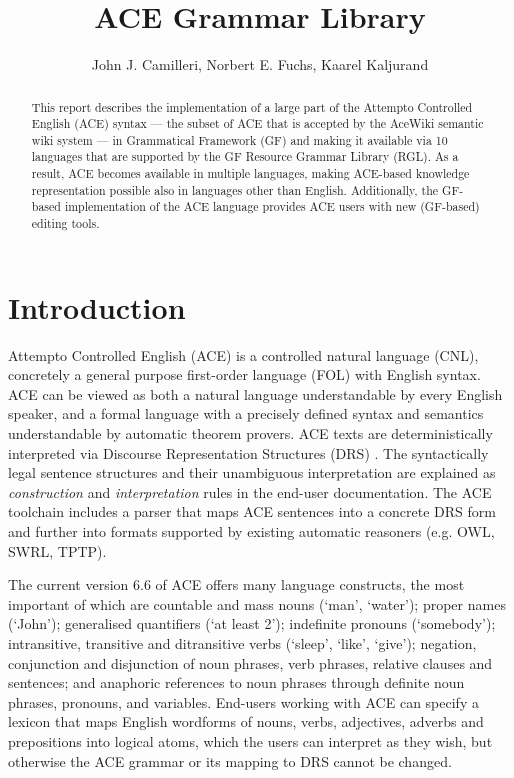 \documentclass[a4paper]{article}
\newcommand\ace{Attempto Controlled English}
\begin{document}
\begin{moltotitlepage}
\title{ACE Grammar Library}
\author{John J. Camilleri, Norbert E. Fuchs, Kaarel Kaljurand}
\end{moltotitlepage}


\begin{abstract}
This report describes the implementation of a large part of the
Attempto Controlled English (ACE) syntax ---
the subset of ACE that is accepted by the AceWiki semantic wiki system ---
in Grammatical Framework (GF) and making it available via 10
languages that are supported by the GF Resource Grammar Library (RGL).
As a result, ACE becomes available in multiple languages, making
ACE-based knowledge representation possible also in languages other than
English.
Additionally, the GF-based implementation of the ACE language provides
ACE users with new (GF-based) editing tools.
\end{abstract}

\clearpage
\thispagestyle{empty}
\tableofcontents

\clearpage
\setcounter{page}{1}
\section{Introduction}

\ace{} (ACE) \cite{fuchs:reasoningweb2008} is a controlled natural language
(CNL), concretely a general purpose
first-order language (FOL)
with English syntax.
ACE can be viewed as both a natural language understandable by every
English speaker, and a formal language with a precisely defined
syntax and semantics understandable by automatic theorem provers.
ACE texts are deterministically interpreted
via Discourse Representation Structures (DRS) \cite{kamp:drt1993}.
The syntactically legal sentence structures and their
unambiguous interpretation are explained as
\emph{construction} and \emph{interpretation} rules
in the end-user documentation.
The ACE toolchain includes a parser that maps ACE sentences into a concrete
DRS form \cite{ifi-2010.0010} and further into formats supported by existing
automatic reasoners (e.g. OWL, SWRL, TPTP).

The current version 6.6 of ACE offers many language constructs, the most
important of which are
countable and mass nouns (`man', `water');
proper names (`John');
generalised quantifiers (`at least 2');
indefinite pronouns (`somebody');
intransitive, transitive and ditransitive verbs (`sleep', `like', `give');
negation, conjunction and disjunction of
noun phrases, verb phrases, relative clauses and sentences;
and anaphoric references to noun phrases through
definite noun phrases, pronouns, and variables.
End-users working with ACE can specify a lexicon that maps English
wordforms of nouns, verbs, adjectives, adverbs and prepositions
into logical atoms,
which the users
can interpret as they wish, but otherwise the ACE grammar or its mapping to
DRS cannot be changed.
\end{document}

